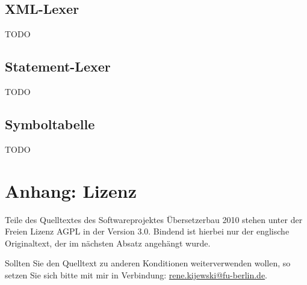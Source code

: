 \documentclass[10pt,a4paper,ngerman,titlepage,tocindentauto]{article}
\begin{document}
		\subsection{XML-Lexer}
			TODO
	
		\subsection{Statement-Lexer}
			TODO
	
		\subsection{Symboltabelle}
			TODO
	
	\section{Anhang: Lizenz}
		Teile des Quelltextes des Softwareprojektes Übersetzerbau 2010 stehen unter der Freien
		Lizenz AGPL in der Version 3.0. Bindend ist hierbei nur der englische Originaltext, der
		im nächsten Absatz angehängt wurde.
		
		Sollten Sie den Quelltext zu anderen Konditionen weiterverwenden wollen, so setzen Sie
		sich bitte mit mir in Verbindung:
		\href{mailto:rene.kijewski@fu-berlin.de?subject=[SWP_CP_2010]}{rene.kijewski@fu-berlin.de}.
		
\end{document}
